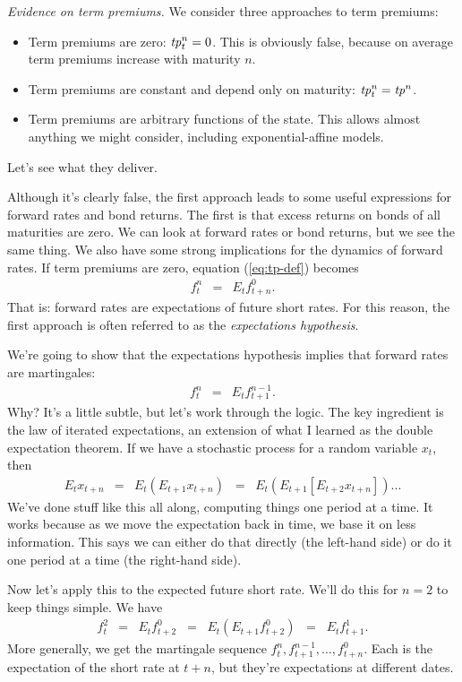 \documentclass[11pt]{article}
\newcommand{\tp}{\mbox{\it tp\/}}
\begin{document}
{\it Evidence on term premiums.\/}
We consider three approaches to term premiums:
\begin{itemize}
\item Term premiums are zero:  $\tp^n_t = 0$.
This is obviously false, because on average term premiums increase with maturity $n$.
\item Term premiums are constant and depend only on maturity:  $\tp^n_t = \tp^n$.
\item Term premiums are arbitrary functions of the state.
This allows almost anything we might consider, including exponential-affine models.
\end{itemize}
Let's see what they deliver.

Although it's clearly false,
the first approach leads to some useful expressions for forward rates and bond returns.
The first is that excess returns on bonds of all maturities are zero.
We can look at forward rates or bond returns, but we see the same thing.
We also have some strong implications for the dynamics of forward rates.  
If term premiums are zero, equation (\ref{eq:tp-def}) becomes
\begin{eqnarray*}
    f^n_t &=&  E_t f^0_{t+n}  .
\end{eqnarray*}
That is:  forward rates are expectations of future short rates.  
For this reason, the first approach is often referred to as
the {\it expectations hypothesis\/}.  


We're going to show that the expectations hypothesis implies
that forward rates are martingales:  
\begin{eqnarray}
    f^n_t &=&  E_t f^{n-1}_{t+1}  .
    \label{eq:forwards-martingale} 
\end{eqnarray}
Why?  It's a little subtle, but let's work through the logic.  
The key ingredient is the law of iterated expectations, 
an extension of what I learned as the double expectation theorem.
If we have a stochastic process for a random variable $x_t$, 
then 
\begin{eqnarray*}
    E_t x_{t+n} &=& E_t \left( E_{t+1} x_{t+n} \right) 
            \;\;=\;\; E_t \left( E_{t+1} [E_{t+2} x_{t+n}] \right) ...  
\end{eqnarray*}
We've done stuff like this all along, computing things one period at a time.
It works because as we move the expectation back in time,
we base it on less information.
This says we can either do that directly (the left-hand side)  
or do it one period at a time (the right-hand side).  

Now let's apply this to the expected future short rate.
We'll do this for $n=2$ to keep things simple.  
We have 
\begin{eqnarray*}
    f^2_t &=&  E_t f^{0}_{t+2}  
            \;\;=\;\; E_t (E_{t+1} f^{0}_{t+2} ) 
            \;\;=\;\; E_t f^{1}_{t+1}  .
\end{eqnarray*}
More generally, we get the martingale sequence 
$f^n_t, f^{n-1}_{t+1}, \ldots , f^{0}_{t+n}$.
Each is the expectation of the short rate at $t+n$, 
but they're expectations at different dates.  
\end{document}
